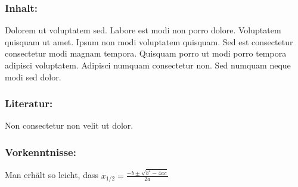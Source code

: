 \subsubsection*{\Large Inhalt:}
Dolorem ut voluptatem sed. Labore est modi non porro dolore. Voluptatem quisquam ut amet. Ipsum non modi voluptatem quisquam. Sed est consectetur consectetur modi magnam tempora. Quisquam porro ut modi porro tempora adipisci voluptatem. Adipisci numquam consectetur non. Sed numquam neque modi sed dolor.
\subsubsection*{\Large Literatur:}
Non consectetur non velit ut dolor.
\subsubsection*{\Large Vorkenntnisse:}
Man erhält so leicht, dass $x_{1/2} = \frac{-b \pm \sqrt{b^2 - 4ac}}{2a}$
